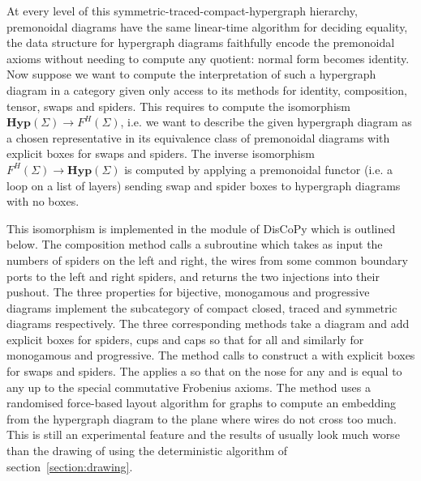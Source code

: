At every level of this symmetric-traced-compact-hypergraph hierarchy, premonoidal diagrams have the same linear-time algorithm for deciding equality, the data structure for hypergraph diagrams faithfully encode the premonoidal axioms without needing to compute any quotient: normal form becomes identity.
Now suppose we want to compute the interpretation of such a hypergraph diagram in a category given only access to its methods for identity, composition, tensor, swaps and spiders.
This requires to compute the isomorphism $\mathbf{Hyp}(\Sigma) \to F^H(\Sigma)$, i.e. we want to describe the given hypergraph diagram as a chosen representative in its equivalence class of premonoidal diagrams with explicit boxes for swaps and spiders.
The inverse isomorphism $F^H(\Sigma) \to \mathbf{Hyp}(\Sigma)$ is computed by applying a premonoidal functor (i.e. a  loop on a list of layers) sending swap and spider boxes to hypergraph diagrams with no boxes.

This isomorphism is implemented in the  module of DisCoPy which is outlined below.
The composition method calls a  subroutine which takes as input the numbers of spiders on the left and right, the wires from some common boundary ports to the left and right spiders, and returns the two injections into their pushout.
The three properties for bijective, monogamous and progressive diagrams implement the subcategory of compact closed, traced and symmetric diagrams respectively.
The three corresponding methods take a diagram and add explicit boxes for spiders, cups and caps so that  for all  and similarly for monogamous and progressive.
The  method calls  to construct a  with explicit boxes for swaps and spiders.
The  applies a  so that  on the nose for any  and  is equal to any  up to the special commutative Frobenius axioms.
The  method uses a randomised force-based layout algorithm for graphs to compute an embedding from the hypergraph diagram to the plane where wires do not cross too much.
This is still an experimental feature and the results of  usually look much worse than the drawing of  using the deterministic algorithm of section~\ref{section:drawing}.

